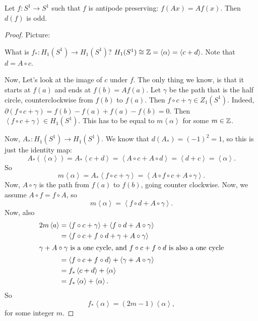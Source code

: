 
\begin{theorem}
    Let $f: S^1 \to S^{1}$ such that $f$ is antipode preserving: $f(A x) = Af(x)$.
    Then $d(f)$ is odd.
\end{theorem}
\begin{proof}
    Picture:
\begin{figure}[H]
    \centering
    \label{fig:antipode-preserving-maps}
\end{figure}
What is $f_*: H_1(S^{1}) \to  H_1(S^{1})$?
$H_1(S^{1}) \cong \mathbb{Z} = \left<\alpha \right> = \left< c + d \right>$.
Note that $d = A  \circ c$.

Now, Let's look at the image of $c$ under  $f$.
The only thing we know, is that it starts at $f(a)$ and ends at $f(b) = A f(a)$.
Let  $\gamma$ be the path that is the half circle, counterclockwise from $f(b)$ to $f(a)$.
Then $f  \circ  c + \gamma \in Z_1(S^{1})$.
Indeed, $\partial(f  \circ  c + \gamma) = f(b) - f(a) + f(a) - f(b) = 0$.
Then $\left<f  \circ  c + \gamma \right> \in H_1(S^{1})$.
This has to be equal to $m \left<\alpha \right>$ for some $m \in \mathbb{Z}$.

Now, $A_*: H_1(S^{1}) \to  H_1(S^{1})$.
We know that $d(A_*) = (-1)^{2} = 1$, so this is just the identity map:
\[
    A_*(\left<\alpha \right>) = A_* \left<c + d \right> = \left<A  \circ  c + A  \circ  d \right> = \left<d + c \right> = \left<\alpha \right>
.\] 
So \[
m \left<\alpha \right> = A_* \left<f  \circ  c + \gamma \right>
= \left<A  \circ  f  \circ  c + A  \circ  \gamma \right>
.\]
Now, $A  \circ  \gamma$ is the path from $f(a)$ to $f(b)$, going counter clockwise. Now, we assume $A  \circ  f = f  \circ  A$, so
\[
m \left<\alpha \right> = \left<f  \circ  d + A  \circ  \gamma \right>
.\] 
Now, also
\begin{align*}
    2 m \left<a \right> &= \left<f  \circ  c + \gamma \right> + \left< f  \circ  d + A  \circ  \gamma \right>\\
                        &= \left<f  \circ  c + f  \circ  d + \gamma + A  \circ  \gamma \right>\\
                        \intertext{$\gamma + A  \circ  \gamma$ is a one cycle, and $f  \circ  c + f  \circ  d$ is also a one cycle}
                        &= \left<f  \circ  c + f  \circ  d \right> + \left<\gamma + A  \circ  \gamma \right>\\
                        &= f_* \left< c + d \right> + \left< \alpha \right>\\
                        &= f_* \left< \alpha \right> + \left<\alpha \right>
.\end{align*} 
So
\[
    f_* \left<\alpha \right> = (2m - 1) \left<\alpha \right>
,\] 
for some integer $m$.
\end{proof}

